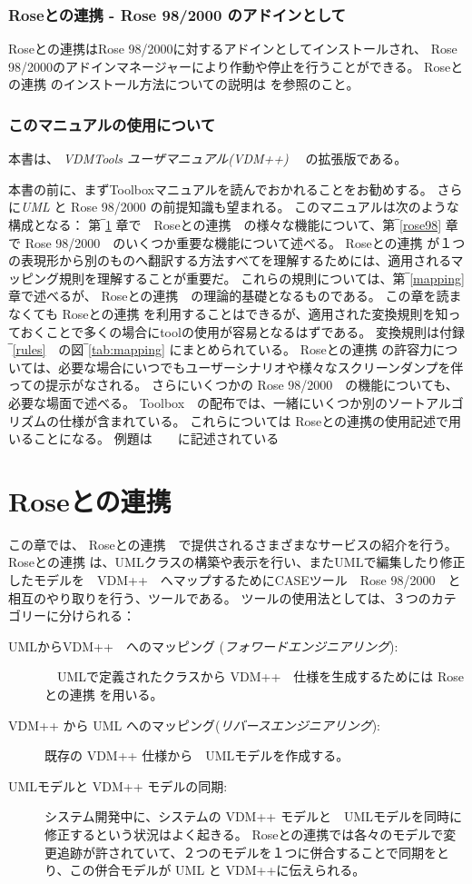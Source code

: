 \documentclass[\pformat,12pt]{jarticle}
\newcommand{\vdmpp}{VDM++}
\newcommand{\link}{Roseとの連携}
\newcommand{\rose}{Rose 98/2000}
\begin{document}
\subsubsection*{\link{} - \rose{} のアドインとして}
 \link{}は\rose{}に対するアドインとしてインストールされ、 \rose{}のアドインマネージャーにより作動や停止を行うことができる。
\link{} のインストール方法についての説明は \cite{InstallPPMan-CSK}を参照のこと。
\subsubsection*{このマニュアルの使用について}

本書は、 {\it VDMTools ユーザマニュアル(\vdmpp{})} \cite{UserManPP-CSK}　の拡張版である。

本書の前に、まずToolboxマニュアルを読んでおかれることをお勧めする。
さらに{\it UML} \cite{Booch&97} と \rose{} \cite{Rational98} の前提知識も望まれる。
このマニュアルは次のような構成となる：
第‾\ref{roselink} 章で　\link{}　の様々な機能について、第‾\ref{rose98} 章で \rose{}　のいくつか重要な機能について述べる。
 \link{} が１つの表現形から別のものへ翻訳する方法すべてを理解するためには、適用されるマッピング規則を理解することが重要だ。
これらの規則については、第‾\ref{mapping}　章で述べるが、
 \link{}　の理論的基礎となるものである。
この章を読まなくても \link{} を利用することはできるが、適用された変換規則を知っておくことで多くの場合にtoolの使用が容易となるはずである。
変換規則は付録‾\ref{rules}　の図‾\ref{tab:mapping} にまとめられている。
 \link{} の許容力については、必要な場合にいつでもユーザーシナリオや様々なスクリーンダンプを伴っての提示がなされる。
さらにいくつかの \rose{}　の機能についても、必要な場面で述べる。
Toolbox　の配布では、一緒にいくつか別のソートアルゴリズムの仕様が含まれている。
これらについては \link{}の使用記述で用いることになる。
例題は　\cite{SortExpp-CSK}　に記述されている

\newpage
\section{\link{}} \label{roselink}

この章では、 \link{}　で提供されるさまざまなサービスの紹介を行う。 
\link{} は、UMLクラスの構築や表示を行い、またUMLで編集したり修正したモデルを　\vdmpp{}　へマップするためにCASEツール　\rose{}　と相互のやり取りを行う、ツールである。
ツールの使用法としては、３つのカテゴリーに分けられる：

\begin{description}

\item[UMLから\vdmpp{}　へのマッピング ({\em フォワードエンジニアリング}):]　UMLで定義されたクラスから \vdmpp{}　仕様を生成するためには \link{} を用いる。
\item[\vdmpp{} から UML へのマッピング({\em リバースエンジニアリング}):] 既存の \vdmpp{} 仕様から　UMLモデルを作成する。
\item[UMLモデルと \vdmpp{} モデルの同期:] システム開発中に、システムの \vdmpp{} モデルと　UMLモデルを同時に修正するという状況はよく起きる。
 \link{}では各々のモデルで変更追跡が許されていて、２つのモデルを１つに併合することで同期をとり、この併合モデルが UML と \vdmpp{}に伝えられる。
\end{description}
\end{document}
